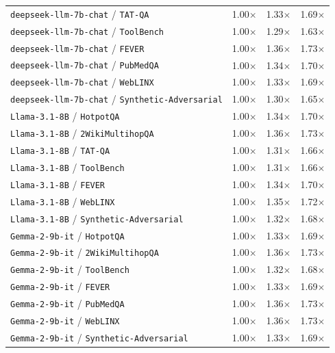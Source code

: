 \begin{longtable}{lccc}
\texttt{deepseek-llm-7b-chat} / \texttt{TAT-QA} & 1.00$\times$ & 1.33$\times$ & 1.69$\times$ \\
\texttt{deepseek-llm-7b-chat} / \texttt{ToolBench} & 1.00$\times$ & 1.29$\times$ & 1.63$\times$ \\
\texttt{deepseek-llm-7b-chat} / \texttt{FEVER} & 1.00$\times$ & 1.36$\times$ & 1.73$\times$ \\
\texttt{deepseek-llm-7b-chat} / \texttt{PubMedQA} & 1.00$\times$ & 1.34$\times$ & 1.70$\times$ \\
\texttt{deepseek-llm-7b-chat} / \texttt{WebLINX} & 1.00$\times$ & 1.33$\times$ & 1.69$\times$ \\
\texttt{deepseek-llm-7b-chat} / \texttt{Synthetic-Adversarial} & 1.00$\times$ & 1.30$\times$ & 1.65$\times$ \\
\texttt{Llama-3.1-8B} / \texttt{HotpotQA} & 1.00$\times$ & 1.34$\times$ & 1.70$\times$ \\
\texttt{Llama-3.1-8B} / \texttt{2WikiMultihopQA} & 1.00$\times$ & 1.36$\times$ & 1.73$\times$ \\
\texttt{Llama-3.1-8B} / \texttt{TAT-QA} & 1.00$\times$ & 1.31$\times$ & 1.66$\times$ \\
\texttt{Llama-3.1-8B} / \texttt{ToolBench} & 1.00$\times$ & 1.31$\times$ & 1.66$\times$ \\
\texttt{Llama-3.1-8B} / \texttt{FEVER} & 1.00$\times$ & 1.34$\times$ & 1.70$\times$ \\
\texttt{Llama-3.1-8B} / \texttt{WebLINX} & 1.00$\times$ & 1.35$\times$ & 1.72$\times$ \\
\texttt{Llama-3.1-8B} / \texttt{Synthetic-Adversarial} & 1.00$\times$ & 1.32$\times$ & 1.68$\times$ \\
\texttt{Gemma-2-9b-it} / \texttt{HotpotQA} & 1.00$\times$ & 1.33$\times$ & 1.69$\times$ \\
\texttt{Gemma-2-9b-it} / \texttt{2WikiMultihopQA} & 1.00$\times$ & 1.36$\times$ & 1.73$\times$ \\
\texttt{Gemma-2-9b-it} / \texttt{ToolBench} & 1.00$\times$ & 1.32$\times$ & 1.68$\times$ \\
\texttt{Gemma-2-9b-it} / \texttt{FEVER} & 1.00$\times$ & 1.33$\times$ & 1.69$\times$ \\
\texttt{Gemma-2-9b-it} / \texttt{PubMedQA} & 1.00$\times$ & 1.36$\times$ & 1.73$\times$ \\
\texttt{Gemma-2-9b-it} / \texttt{WebLINX} & 1.00$\times$ & 1.36$\times$ & 1.73$\times$ \\
\texttt{Gemma-2-9b-it} / \texttt{Synthetic-Adversarial} & 1.00$\times$ & 1.33$\times$ & 1.69$\times$ \\

\end{longtable}
